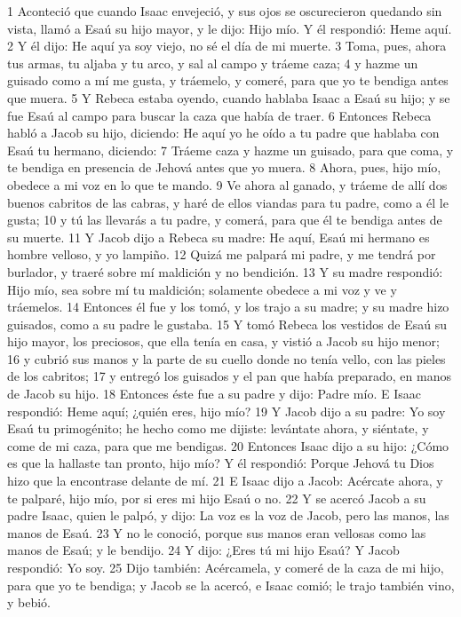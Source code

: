 1 Aconteció que cuando Isaac envejeció, y sus ojos se oscurecieron quedando sin vista, llamó a Esaú su hijo mayor, y le dijo: Hijo mío. Y él respondió: Heme aquí.
2 Y él dijo: He aquí ya soy viejo, no sé el día de mi muerte.
3 Toma, pues, ahora tus armas, tu aljaba y tu arco, y sal al campo y tráeme caza;
4 y hazme un guisado como a mí me gusta, y tráemelo, y comeré, para que yo te bendiga antes que muera.
5 Y Rebeca estaba oyendo, cuando hablaba Isaac a Esaú su hijo; y se fue Esaú al campo para buscar la caza que había de traer.
6 Entonces Rebeca habló a Jacob su hijo, diciendo: He aquí yo he oído a tu padre que hablaba con Esaú tu hermano, diciendo:
7 Tráeme caza y hazme un guisado, para que coma, y te bendiga en presencia de Jehová antes que yo muera.
8 Ahora, pues, hijo mío, obedece a mi voz en lo que te mando.
9 Ve ahora al ganado, y tráeme de allí dos buenos cabritos de las cabras, y haré de ellos viandas para tu padre, como a él le gusta;
10 y tú las llevarás a tu padre, y comerá, para que él te bendiga antes de su muerte.
11 Y Jacob dijo a Rebeca su madre: He aquí, Esaú mi hermano es hombre velloso, y yo lampiño.
12 Quizá me palpará mi padre, y me tendrá por burlador, y traeré sobre mí maldición y no bendición.
13 Y su madre respondió: Hijo mío, sea sobre mí tu maldición; solamente obedece a mi voz y ve y tráemelos.
14 Entonces él fue y los tomó, y los trajo a su madre; y su madre hizo guisados, como a su padre le gustaba.
15 Y tomó Rebeca los vestidos de Esaú su hijo mayor, los preciosos, que ella tenía en casa, y vistió a Jacob su hijo menor;
16 y cubrió sus manos y la parte de su cuello donde no tenía vello, con las pieles de los cabritos;
17 y entregó los guisados y el pan que había preparado, en manos de Jacob su hijo.
18 Entonces éste fue a su padre y dijo: Padre mío. E Isaac respondió: Heme aquí; ¿quién eres, hijo mío?
19 Y Jacob dijo a su padre: Yo soy Esaú tu primogénito; he hecho como me dijiste: levántate ahora, y siéntate, y come de mi caza, para que me bendigas.
20 Entonces Isaac dijo a su hijo: ¿Cómo es que la hallaste tan pronto, hijo mío? Y él respondió: Porque Jehová tu Dios hizo que la encontrase delante de mí.
21 E Isaac dijo a Jacob: Acércate ahora, y te palparé, hijo mío, por si eres mi hijo Esaú o no.
22 Y se acercó Jacob a su padre Isaac, quien le palpó, y dijo: La voz es la voz de Jacob, pero las manos, las manos de Esaú.
23 Y no le conoció, porque sus manos eran vellosas como las manos de Esaú; y le bendijo.
24 Y dijo: ¿Eres tú mi hijo Esaú? Y Jacob respondió: Yo soy.
25 Dijo también: Acércamela, y comeré de la caza de mi hijo, para que yo te bendiga; y Jacob se la acercó, e Isaac comió; le trajo también vino, y bebió.
